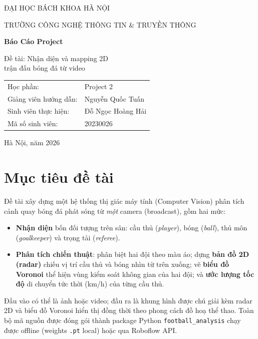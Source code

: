 \documentclass[12pt,a4paper]{article}
\begin{document}
\begin{titlepage}
\centering
{\large ĐẠI HỌC BÁCH KHOA HÀ NỘI\par}
{\large TRƯỜNG CÔNG NGHỆ THÔNG TIN \& TRUYỀN THÔNG\par}
\vspace{3cm}
{\Huge\bfseries Báo Cáo Project\par}
\vspace{1cm}
{\Large Đề tài: Nhận diện và mapping 2D\\[4pt] trận đấu bóng đá từ video\par}
\vspace{2cm}
\begin{flushleft}
\hspace{3cm}\begin{tabular}{ll}
Học phần: & Project 2\\[4pt]
Giảng viên hướng dẫn: & Nguyễn Quốc Tuấn\\[4pt]
Sinh viên thực hiện: & Đỗ Ngọc Hoàng Hải\\[4pt]
Mã số sinh viên: & 20230026\\
\end{tabular}
\end{flushleft}
\vfill
{\large Hà Nội, năm 2026\par}
\end{titlepage}

\tableofcontents
\newpage

\section{Mục tiêu đề tài}
Đề tài xây dựng một hệ thống thị giác máy tính (Computer Vision) phân tích cảnh quay
bóng đá phát sóng từ \emph{một} camera (broadcast), gồm hai mức:
\begin{itemize}[leftmargin=1.4em]
  \item \textbf{Nhận diện} bốn đối tượng trên sân: cầu thủ (\textit{player}), bóng
        (\textit{ball}), thủ môn (\textit{goalkeeper}) và trọng tài (\textit{referee}).
  \item \textbf{Phân tích chiến thuật}: phân biệt hai đội theo màu áo; dựng
        \textbf{bản đồ 2D (radar)} chiếu vị trí cầu thủ và bóng nhìn từ trên xuống;
        vẽ \textbf{biểu đồ Voronoi} thể hiện vùng kiểm soát không gian của hai đội;
        và \textbf{ước lượng tốc độ} di chuyển tức thời (km/h) của từng cầu thủ.
\end{itemize}
Đầu vào có thể là ảnh hoặc video; đầu ra là khung hình được chú giải kèm radar 2D và
biểu đồ Voronoi hiển thị đồng thời theo phong cách đồ hoạ thể thao. Toàn bộ mã nguồn
được đóng gói thành package Python \texttt{football\_analysis} chạy được offline
(weights \texttt{.pt} local) hoặc qua Roboflow API.
\end{document}
